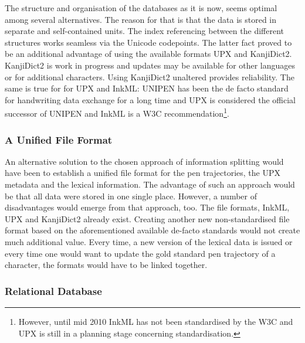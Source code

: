 The structure and organisation of the databases as it is now, seems optimal
among several alternatives. The reason for that is that the data is stored in
separate and self-contained units. The index referencing between the different
structures works seamless via the Unicode codepoints. The latter fact proved
to be an additional advantage of using the available formats UPX and
KanjiDict2. KanjiDict2 is work in progress and updates may be available 
for other languages or for additional characters. 
Using KanjiDict2 unaltered provides reliability.
The same is true for for UPX and InkML: UNIPEN has been the de facto standard
for handwriting data exchange for a long time and UPX is considered the
official successor of UNIPEN and InkML is a W3C recommendation\footnote{
However, until mid 2010 InkML has not been standardised by the W3C and
UPX is still in a planning stage concerning standardisation.}.

\subsubsection{A Unified File Format}
\label{sec:hwre:aunifiedfileformat}

An alternative solution to the chosen approach of information splitting 
would have been to establish a unified file format for the pen trajectories, 
the UPX metadata and the lexical information. 
The advantage of such an approach would be that all data were stored in one 
single place. However, a number of disadvantages would emerge from 
that approach, too.
The file formats, InkML, UPX and KanjiDict2 already exist.
Creating another new non-standardised file format based on 
the aforementioned available de-facto standards would not create much 
additional value. Every time, a new version of the lexical data is issued or 
every time one would want to update the gold standard pen trajectory 
of a character, the formats would have to be linked together. 

\subsubsection{Relational Database}
\label{sec:hwre:relationaldatabase}

